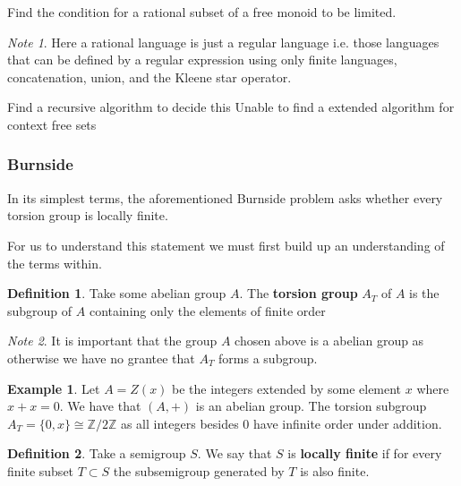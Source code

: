\documentclass[12pt,a4paper]{amsart}
\newcommand{\Z}{\mathbb{Z}}
\theoremstyle{definition}
\newtheorem{defn}{Definition}[section]
\newtheorem{ex}{Example}[section]
\theoremstyle{remark}
\newtheorem*{note}{Note}
\begin{document}
Find the condition for a rational subset of a free monoid to be limited. 
\begin{note}
Here a rational language is just a regular language i.e. those languages that can be defined by a regular expression using only finite languages, concatenation, union, and the Kleene star operator.
\end{note}
Find a recursive algorithm to decide this
Unable to find a extended algorithm for context free sets
\subsubsection{Burnside}

In its simplest terms, the aforementioned Burnside problem asks whether every torsion group is locally finite.

For us to understand this statement we must first build up an understanding of the terms within.

\begin{defn}
Take some abelian group $A$. The \textbf{torsion group} $A_T$ of $A$ is the subgroup of $A$ containing only the elements of finite order
\end{defn}

\begin{note}
It is important that the group $A$ chosen above is a abelian group as otherwise we have no grantee that $A_T$ forms a subgroup.
\end{note}

\begin{ex}
Let $A = Z(x)$ be the integers extended by some element $x$ where $x+x=0$. We have that $(A,+)$ is an abelian group. The torsion subgroup $A_T = \{0,x\} \cong \Z/2\Z$ as all integers besides $0$ have infinite order under addition.
\end{ex}

\begin{defn}
Take a semigroup $S$. We say that $S$ is \textbf{locally finite} if for every finite subset $T\subset S$ the subsemigroup generated by $T$ is also finite.
\end{defn}
\end{document}
